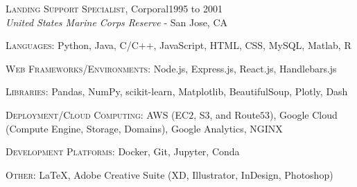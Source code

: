 \documentclass[hidelinks, 10pt]{article}
\begin{document}
{\vspace{2.5mm}

\begin{minipage}[ct]{0.9\linewidth}
\textsc{Landing Support Specialist}, Corporal\hfill 1995 to 2001\\
{\emph{United States Marine Corps Reserve} - San Jose, CA}
\end{minipage}

\vspace{4mm}


\hrulefill

\vspace{4mm}

\begin{minipage}[ct]{0.9\linewidth}
\textsc{Languages: } Python, Java, C/C++, JavaScript, HTML, CSS, MySQL, Matlab, R



\vspace{1.5mm}

\textsc{Web Frameworks/Environments: } Node.js, Express.js, React.js, Handlebars.js

\vspace{1.5mm}

\textsc{Libraries: } Pandas, NumPy, scikit-learn, Matplotlib, BeautifulSoup,
Plotly, Dash

\vspace{1.5mm}

\textsc{Deployment/Cloud Computing:} AWS (EC$2$, S$3$, and Route$53$),
Google Cloud (Compute Engine, Storage, Domains), Google Analytics, NGINX

\vspace{1.5mm}

\textsc{Development Platforms: } Docker, Git, Jupyter, Conda



\vspace{1.5mm}

\textsc{Other: } \LaTeX, Adobe Creative Suite (XD, Illustrator, InDesign, Photoshop)
\end{minipage}

}
\end{document}
